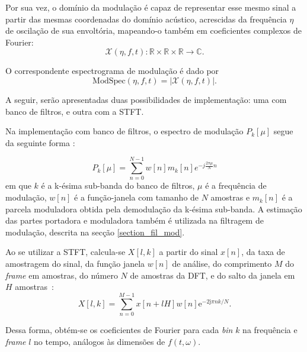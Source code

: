 Por sua vez, o domínio da modulação é capaz de representar esse mesmo sinal a
partir das mesmas coordenadas do domínio acústico, acrescidas da frequência
$\eta$ de oscilação de sua envoltória, mapeando-o também em coeficientes
complexos de Fourier:
\begin{equation}
\mathcal{X}(\eta, f, t): \mathbb{R}  \times \mathbb{R}  \times  \mathbb{R} \rightarrow \mathbb{C}.
\end{equation}

O correspondente espectrograma de modulação é dado por
\begin{equation}
      \mathrm{Mod Spec}(\eta, f, t) = \left\lvert \mathcal{X}(\eta, f, t)\right\rvert.
\end{equation}

A seguir, serão apresentadas duas possibilidades de implementação: uma com banco
de filtros, e outra com a STFT.

Na implementação com banco de filtros, o espectro de modulação $P_k[\mu]$ segue da
seguinte forma \cite{toolbox2010}:

\begin{equation} \label{modspec_filterbank}
    P_k[\mu] = \sum_{n = 0}^{N - 1} w[n]m_k[n] e^{-j \frac{2 \pi \mu}{N} n}
\end{equation}
em que $k$ é a k-ésima sub-banda do banco de filtros, $\mu$ é a frequência de
modulação, $w[n]$ é a função-janela com tamanho de $N$ amostras e $m_k[n]$ é a
parcela moduladora obtida pela demodulação da k-ésima sub-banda. A estimação das
partes portadora e moduladora também é utilizada na filtragem de modulação,
descrita na secção \ref{section_fil_mod}.

Ao se utilizar a STFT, calcula-se $X[l,k]$ a partir do sinal $x[n]$, da taxa de
amostragem do sinal, da função janela $w[n]$ de análise, do comprimento $M$ do
\textit{frame} em amostras, do número $N$ de amostras da DFT, e do salto da janela
em $H$ amostras~\cite{paliwal2015,mauricio}:
 \begin{equation}
      X[l, k] = \sum_{n = 0}^{M-1} x[n + l H] w[n]{\mathrm{e}^{-2\mathrm{j}\pi n k/N}}. 
 \end{equation}
 
Dessa forma, obtém-se os coeficientes de Fourier para cada \textit{bin} $k$ na
 frequência e \textit{frame} $l$ no tempo, análogos às dimensões de
 $f(t,\omega)$.

